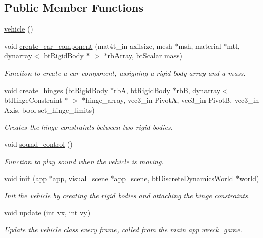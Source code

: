 \subsection*{Public Member Functions}
\begin{DoxyCompactItemize}
\item 
\hyperlink{classoctet_1_1vehicle_a22017fec042aa7732f1699b535390787}{vehicle} ()
\item 
void \hyperlink{classoctet_1_1vehicle_aa0d5baefeba0587e62f9c62dc87506fb}{create\+\_\+car\+\_\+component} (mat4t\+\_\+in axilsize, mesh $\ast$msh, material $\ast$mtl, dynarray$<$ bt\+Rigid\+Body $\ast$ $>$ $\ast$rb\+Array, bt\+Scalar mass)
\begin{DoxyCompactList}\small\item\em Function to create a car component, assigning a rigid body array and a mass. \end{DoxyCompactList}\item 
void \hyperlink{classoctet_1_1vehicle_a36bcb4433889025632bfec79f681a877}{create\+\_\+hinges} (bt\+Rigid\+Body $\ast$rb\+A, bt\+Rigid\+Body $\ast$rb\+B, dynarray$<$ bt\+Hinge\+Constraint $\ast$ $>$ $\ast$hinge\+\_\+array, vec3\+\_\+in Pivot\+A, vec3\+\_\+in Pivot\+B, vec3\+\_\+in Axis, bool set\+\_\+hinge\+\_\+limits)
\begin{DoxyCompactList}\small\item\em Creates the hinge constraints between two rigid bodies. \end{DoxyCompactList}\item 
void \hyperlink{classoctet_1_1vehicle_a45b69ee9ab03cf7b1c05dfdb88eb783c}{sound\+\_\+control} ()
\begin{DoxyCompactList}\small\item\em Function to play sound when the vehicle is moving. \end{DoxyCompactList}\item 
void \hyperlink{classoctet_1_1vehicle_af1ecc8cb043d912123287e085dd3417d}{init} (app $\ast$app, visual\+\_\+scene $\ast$app\+\_\+scene, bt\+Discrete\+Dynamics\+World $\ast$world)
\begin{DoxyCompactList}\small\item\em Init the vehicle by creating the rigid bodies and attaching the hinge constraints. \end{DoxyCompactList}\item 
void \hyperlink{classoctet_1_1vehicle_ab09e8ef71ff3dac91e82f93252884e7a}{update} (int vx, int vy)
\begin{DoxyCompactList}\small\item\em Update the vehicle class every frame, called from the main app \hyperlink{classoctet_1_1wreck__game}{wreck\+\_\+game}. \end{DoxyCompactList}\item 

\end{DoxyCompactItemize}
